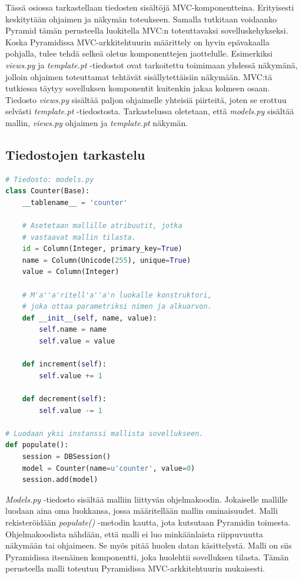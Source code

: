 \documentclass[finnish,utf8,nonumbib,palatino,kandi]{gradu2}
\begin{document}
Tässä osiossa tarkastellaan tiedosten sisältöjä MVC-komponentteina. Erityisesti keskitytään ohjaimen ja näkymän toteukseen. Samalla tutkitaan voidaanko Pyramid tämän perusteella luokitella MVC:n toteuttavaksi sovelluskehykseksi. 
Koska Pyramidissa MVC-arkkitehtuurin määrittely on hyvin epävakaalla pohjalla, tulee tehdä selkeä oletus komponenttejen jaottelulle. Esimerkiksi \emph{views.py} ja \emph{template.pt} -tiedostot ovat tarkoitettu toimimaan yhdessä näkymänä, jolloin ohjaimen toteuttamat tehtävät sisällytettäisiin näkymään. MVC:tä tutkiessa täytyy sovelluksen komponentit kuitenkin jakaa kolmeen osaan.  Tiedosto \emph{views.py}
sisältää paljon ohjaimelle yhteisiä piirteitä, joten se erottuu selvästi \emph{template.pt} -tiedostosta. Tarkastelussa oletetaan, että  \emph{models.py} sisältää mallin, \emph{views.py} ohjaimen ja \emph{template.pt} näkymän. 

\subsection{Tiedostojen tarkastelu}
\lstset{numbers=left}
\begin{lstlisting}[language=Python]
# Tiedosto: models.py
class Counter(Base):
    __tablename__ = 'counter'

    # Asetetaan mallille atribuutit, jotka 
    # vastaavat mallin tilasta.
    id = Column(Integer, primary_key=True)
    name = Column(Unicode(255), unique=True)
    value = Column(Integer)

    # M'a''a'ritell'a''a'n luokalle konstruktori,
    # joka ottaa parametriksi nimen ja alkuarvon.
    def __init__(self, name, value):
        self.name = name
        self.value = value

    def increment(self):
        self.value += 1

    def decrement(self):
        self.value -= 1

# Luodaan yksi instanssi mallista sovellukseen.
def populate():
    session = DBSession()
    model = Counter(name=u'counter', value=0)
    session.add(model)
\end{lstlisting} 

\emph{Models.py} -tiedosto sisältää malliin liittyvän ohjelmakoodin. Jokaiselle mallille luodaan aina oma luokkansa, jossa määritellään mallin ominaisuudet. Malli rekisteröidään \emph{populate()} -metodin kautta, jota kutsutaan Pyramidin toimesta.
Ohjelmakoodista nähdään, että malli ei luo minkäänlaista riippuvuutta näkymään tai ohjaimeen. Se myös pitää huolen datan käsittelystä.  Malli on siis Pyramidissa itsenäinen komponentti, joka huolehtii sovelluksen tilasta. Tämän perusteella malli toteutuu Pyramidissa MVC-arkkitehtuurin mukaisesti. \\
\end{document}
